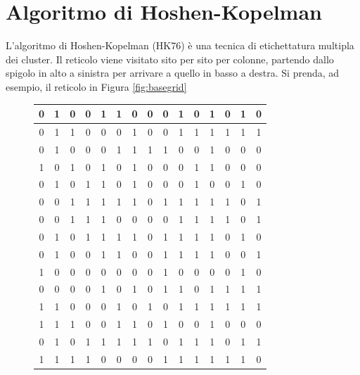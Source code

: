 \section{Algoritmo di Hoshen-Kopelman}
L’algoritmo di Hoshen-Kopelman (HK76) è una tecnica di etichettatura multipla dei cluster. Il reticolo viene visitato sito per sito per colonne, partendo dallo spigolo in alto a sinistra per arrivare a quello in basso a destra. Si prenda, ad esempio, il reticolo in Figura \ref{fig:basegrid}
\begin{figure}[H]
	\centering
	\scriptsize %
	\setlength{\tabcolsep}{5.4pt} %
	\renewcommand{\arraystretch}{1.2} %
	\begin{minipage}{0.4\textwidth}
		\centering
		\begin{tabular}{|*{15}{c|}}
			\hline
			0 & 1 & 0 & 0 & 1 & 1 & 0 & 0 & 0 & 1 & 0 & 1 & 0 & 1 & 0 \\
			\hline
			0 & 1 & 1 & 0 & 0 & 0 & 1 & 0 & 0 & 1 & 1 & 1 & 1 & 1 & 1 \\
			\hline
			0 & 1 & 0 & 0 & 0 & 1 & 1 & 1 & 1 & 0 & 0 & 1 & 0 & 0 & 0 \\
			\hline
			1 & 0 & 1 & 0 & 1 & 0 & 1 & 0 & 0 & 0 & 1 & 1 & 0 & 0 & 0 \\
			\hline
			0 & 1 & 0 & 1 & 1 & 0 & 1 & 0 & 0 & 0 & 1 & 0 & 0 & 1 & 0 \\
			\hline
			0 & 0 & 1 & 1 & 1 & 1 & 1 & 0 & 1 & 1 & 1 & 1 & 1 & 0 & 1 \\
			\hline
			0 & 0 & 1 & 1 & 1 & 0 & 0 & 0 & 0 & 1 & 1 & 1 & 1 & 0 & 1 \\
			\hline
			0 & 1 & 0 & 1 & 1 & 1 & 1 & 0 & 1 & 1 & 1 & 1 & 0 & 1 & 0 \\
			\hline
			0 & 1 & 0 & 0 & 1 & 1 & 0 & 0 & 1 & 1 & 1 & 1 & 0 & 0 & 1 \\
			\hline
			1 & 0 & 0 & 0 & 0 & 0 & 0 & 0 & 1 & 0 & 0 & 0 & 0 & 1 & 0 \\
			\hline
			0 & 0 & 0 & 0 & 1 & 0 & 1 & 0 & 1 & 1 & 0 & 1 & 1 & 1 & 1 \\
			\hline
			1 & 1 & 0 & 0 & 0 & 1 & 0 & 1 & 0 & 1 & 1 & 1 & 1 & 1 & 1 \\
			\hline
			1 & 1 & 1 & 0 & 0 & 1 & 1 & 0 & 1 & 0 & 0 & 1 & 0 & 0 & 0 \\
			\hline
			0 & 1 & 0 & 1 & 1 & 1 & 1 & 1 & 0 & 1 & 1 & 1 & 0 & 1 & 1 \\
			\hline
			1 & 1 & 1 & 1 & 0 & 0 & 0 & 0 & 1 & 1 & 1 & 1 & 1 & 1 & 0 \\

\end{tabular}
\end{minipage}
\end{figure}
